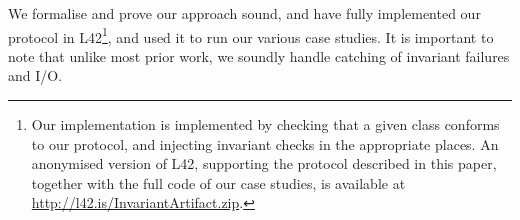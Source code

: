 We formalise and prove our approach sound, and have fully implemented our protocol in L42\footnote{
Our implementation is implemented by checking that a given class conforms to our protocol, and injecting invariant checks in the appropriate places.
An anonymised version of L42, supporting the protocol described in this paper, together with the full code of our case studies, is available at \url{http://l42.is/InvariantArtifact.zip}. %
}, and used it to run our various case studies.
It is important to note that unlike most prior work, we soundly handle catching of invariant failures and I/O.

